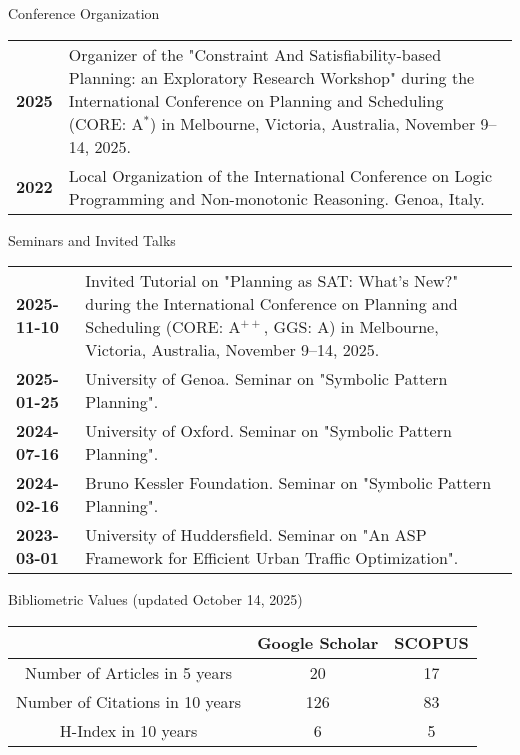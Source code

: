 \documentclass{resume} %
\begin{document}
   \begin{rSection}{Conference Organization}
	\begin{tabularx}{0.95\textwidth} {lp{14cm}}
 \textbf{2025} & Organizer of the "Constraint And Satisfiability-based Planning: an Exploratory Research Workshop" during the International Conference on Planning and Scheduling (CORE: A$^*$) in Melbourne, Victoria, Australia, November 9–14, 2025. \\
  \textbf{2022} & Local Organization of the International Conference on Logic Programming and Non-monotonic Reasoning. Genoa, Italy.
  \end{tabularx}
 \end{rSection}

\break
 \begin{rSection}{Seminars and Invited Talks}
 	\begin{tabularx}{0.95\textwidth} {lp{14cm}}
 \textbf{2025-11-10} & Invited Tutorial on "Planning as SAT: What's New?" during the International Conference on Planning and Scheduling (CORE: A$^{++}$, GGS: A) in Melbourne, Victoria, Australia, November 9–14, 2025.\\
  \textbf{2025-01-25} & University of Genoa. Seminar on "Symbolic Pattern Planning".\\
 \textbf{2024-07-16} & University of Oxford. Seminar on "Symbolic Pattern Planning".\\
 \textbf{2024-02-16} & Bruno Kessler Foundation. Seminar on "Symbolic Pattern Planning".\\
 \textbf{2023-03-01} & University of Huddersfield. Seminar on "An ASP Framework for Efficient Urban Traffic Optimization".\\
 \end{tabularx}

\end{rSection}

\begin{rSection}{Bibliometric Values \tiny{(updated October 14, 2025)}}
\begin{center}
	
\begin{tabular}{ccc}

 & Google Scholar & SCOPUS \\ \hline
\multicolumn{1}{c}{Number of Articles in 5 years} & 20 & 17 \\ \hline
\multicolumn{1}{c}{Number of Citations in 10 years} & 126 & 83 \\ \hline
\multicolumn{1}{c}{H-Index in 10 years} & 
6 & 5 \\ 
\end{tabular}%
\end{center}
\end{rSection}
\end{document}

